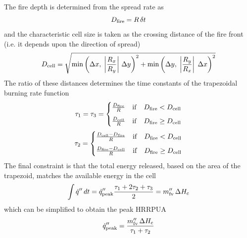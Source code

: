 The fire depth is determined from the spread rate as
\begin{equation}
D_{\rm fire} =  R \, \delta t
\end{equation}
and the characteristic cell size is taken as the crossing distance of the fire front (i.e. it depends upon the direction of spread)
\begin{equation}
D_{\rm cell} = \sqrt{\min \left(\Delta x, \; \left|\frac{R_x}{R_y}\right| \, \Delta y \right)^2 + 
\min \left(\Delta y, \; \left|\frac{R_y}{R_x}\right| \; \Delta x \right)^2}
\end{equation}
The ratio of these distances determines the time constants of the trapezoidal burning rate function
\begin{equation}
\tau_1 = \tau_3 = 
\begin{cases}
    \frac{D_{\rm fire}}{R} & \mathrm{if} \quad D_{\rm fire} < D_{\rm cell} \\[6pt]
    \frac{D_{\rm cell}}{R} & \mathrm{if} \quad D_{\rm fire} \ge D_{\rm cell}
\end{cases}
\end{equation}
\begin{equation}
\tau_2 = 
\begin{cases}
    \frac{D_{\rm cell} - D_{\rm fire}}{R} & \mathrm{if} \quad D_{\rm fire} < D_{\rm cell} \\[6pt]
    \frac{D_{\rm fire} - D_{\rm cell}}{R} & \mathrm{if} \quad D_{\rm fire} \ge D_{\rm cell}
\end{cases}
\end{equation}
The final constraint is that the total energy released, based on the area of the trapezoid, matches the available energy in the cell
\begin{equation}
\int \dot{q}'' \, dt = \dot{q}_{\rm peak}'' \frac{\tau_1 + 2\tau_2 + \tau_3}{2} = m_{\rm fv}'' \, \Delta H_{\rm c}
\end{equation}
which can be simplified to obtain the peak HRRPUA
\begin{equation}
\dot{q}_{\rm peak}'' = \frac{m_{\rm fv}'' \, \Delta H_{\rm c}}{\tau_1 + \tau_2}
\end{equation}

